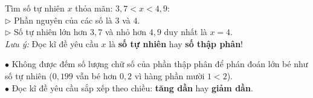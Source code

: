 \documentclass[14pt,a4paper,oneside]{extbook}
\begin{document}
\noindent
\begin{minipage}[t]{0.54\textwidth}
  \begin{tcolorbox}[
    enhanced,
    title={\footnotesize\bfseries\color{white}\faSearch\ Dạng toán tìm $x$ kẹp giữa hai số thập phân},
    colback=green!3!white,
    colframe=green!60!black,
    arc=2.5mm, boxrule=0.8pt, top=1.8mm, bottom=1.8mm, left=2.2mm, right=2.2mm
  ]
    \footnotesize
    Tìm số tự nhiên $x$ thỏa mãn: $3,7 < x < 4,9$:\\
    $\triangleright$ Phần nguyên của các số là $3$ và $4$.\\
    $\triangleright$ Số tự nhiên lớn hơn $3,7$ và nhỏ hơn $4,9$ duy nhất là $x = 4$.\\
    \textit{Lưu ý:} Đọc kĩ đề yêu cầu $x$ là \textbf{số tự nhiên} hay \textbf{số thập phân}!
  \end{tcolorbox}
\end{minipage}%
\hfill
\begin{minipage}[t]{0.44\textwidth}
  \begin{tcolorbox}[
    enhanced,
    title={\footnotesize\bfseries\color{white}\faExclamationTriangle\ Mẹo tránh bẫy trắc nghiệm},
    colback=red!2!white,
    colframe=red!70!black,
    arc=2.5mm, boxrule=0.8pt, top=1.8mm, bottom=1.8mm, left=2.2mm, right=2.2mm
  ]
    \footnotesize
    $\bullet$ Không được đếm số lượng chữ số của phần thập phân để phán đoán lớn bé như số tự nhiên ($0,199$ vẫn bé hơn $0,2$ vì hàng phần mười $1 < 2$).\\
    $\bullet$ Đọc kĩ đề yêu cầu sắp xếp theo chiều: \textbf{tăng dần} hay \textbf{giảm dần}.
  \end{tcolorbox}
\end{minipage}
\end{document}
